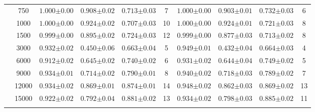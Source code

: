 \begin{table}[H]
\begin{tabularx}{\textwidth}{cc | YYYc | YYYc }
        & 750 & $1.000{\scriptscriptstyle\pm0.00}$ & $0.908{\scriptscriptstyle\pm0.02}$ & $0.713{\scriptscriptstyle\pm0.03}$ & 7 & $1.000{\scriptscriptstyle\pm0.00}$ & $0.903{\scriptscriptstyle\pm0.01}$ & $0.732{\scriptscriptstyle\pm0.03}$ & 6\\
        & 1000 & $1.000{\scriptscriptstyle\pm0.00}$ & $0.924{\scriptscriptstyle\pm0.02}$ & $0.707{\scriptscriptstyle\pm0.03}$ & 10 & $1.000{\scriptscriptstyle\pm0.00}$ & $0.924{\scriptscriptstyle\pm0.01}$ & $0.721{\scriptscriptstyle\pm0.03}$ & 8\\
        & 1500 & $0.999{\scriptscriptstyle\pm0.00}$ & $0.895{\scriptscriptstyle\pm0.02}$ & $0.724{\scriptscriptstyle\pm0.03}$ & 12 & $0.999{\scriptscriptstyle\pm0.00}$ & $0.877{\scriptscriptstyle\pm0.03}$ & $0.713{\scriptscriptstyle\pm0.02}$ & 8\\
        & 3000 & $0.932{\scriptscriptstyle\pm0.02}$ & $0.450{\scriptscriptstyle\pm0.06}$ & $0.663{\scriptscriptstyle\pm0.04}$ & 5 & $0.949{\scriptscriptstyle\pm0.01}$ & $0.432{\scriptscriptstyle\pm0.04}$ & $0.664{\scriptscriptstyle\pm0.03}$ & 4\\
        & 6000 & $0.912{\scriptscriptstyle\pm0.02}$ & $0.645{\scriptscriptstyle\pm0.02}$ & $0.740{\scriptscriptstyle\pm0.02}$ & 6 & $0.931{\scriptscriptstyle\pm0.02}$ & $0.644{\scriptscriptstyle\pm0.04}$ & $0.749{\scriptscriptstyle\pm0.02}$ & 5\\
        & 9000 & $0.934{\scriptscriptstyle\pm0.01}$ & $0.714{\scriptscriptstyle\pm0.02}$ & $0.790{\scriptscriptstyle\pm0.01}$ & 8 & $0.940{\scriptscriptstyle\pm0.02}$ & $0.718{\scriptscriptstyle\pm0.03}$ & $0.789{\scriptscriptstyle\pm0.02}$ & 7\\
        & 12000 & $0.934{\scriptscriptstyle\pm0.02}$ & $0.869{\scriptscriptstyle\pm0.01}$ & $0.874{\scriptscriptstyle\pm0.01}$ & 14 & $0.948{\scriptscriptstyle\pm0.02}$ & $0.862{\scriptscriptstyle\pm0.03}$ & $0.869{\scriptscriptstyle\pm0.02}$ & 13\\
        & 15000 & $0.922{\scriptscriptstyle\pm0.02}$ & $0.792{\scriptscriptstyle\pm0.04}$ & $0.881{\scriptscriptstyle\pm0.02}$ & 13 & $0.934{\scriptscriptstyle\pm0.02}$ & $0.798{\scriptscriptstyle\pm0.03}$ & $0.885{\scriptscriptstyle\pm0.02}$ & 11\\
         \\
    \end{tabularx}
\end{table}

